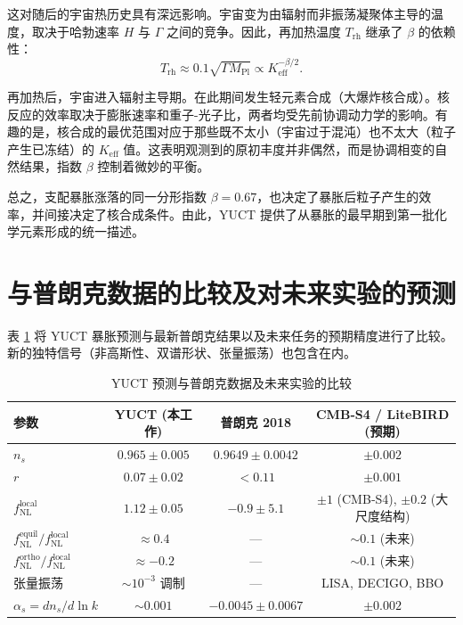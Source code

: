 \documentclass[11pt,a4paper]{article}
\newcommand{\Keff}{K_{\mathrm{eff}}}
\newcommand{\rs}{r}
\begin{document}
	这对随后的宇宙热历史具有深远影响。宇宙变为由辐射而非振荡凝聚体主导的温度，取决于哈勃速率 \(H\) 与 \(\Gamma\) 之间的竞争。因此，再加热温度 \(T_{\mathrm{rh}}\) 继承了 \(\beta\) 的依赖性：
	\begin{equation}
		T_{\mathrm{rh}} \approx 0.1 \sqrt{\Gamma M_{\mathrm{Pl}}} \propto \Keff^{-\beta/2}.
		\label{eq:trh}
	\end{equation}
	
	再加热后，宇宙进入辐射主导期。在此期间发生轻元素合成（大爆炸核合成）。核反应的效率取决于膨胀速率和重子-光子比，两者均受先前协调动力学的影响。有趣的是，核合成的最优范围对应于那些既不太小（宇宙过于混沌）也不太大（粒子产生已冻结）的 \(\Keff\) 值。这表明观测到的原初丰度并非偶然，而是协调相变的自然结果，指数 \(\beta\) 控制着微妙的平衡。
	
	总之，支配暴胀涨落的同一分形指数 \(\beta = 0.67\)，也决定了暴胀后粒子产生的效率，并间接决定了核合成条件。由此，YUCT 提供了从暴胀的最早期到第一批化学元素形成的统一描述。
	
	\section{与普朗克数据的比较及对未来实验的预测}
	\label{sec:comparison}
	
	表 \ref{tab:comparison} 将 YUCT 暴胀预测与最新普朗克结果以及未来任务的预期精度进行了比较。新的独特信号（非高斯性、双谱形状、张量振荡）也包含在内。
	
	\begin{table}[htbp]
		\centering
		\caption{YUCT 预测与普朗克数据及未来实验的比较}
		\label{tab:comparison}
		\begin{tabular}{lccc}
			\toprule
			\textbf{参数} & \textbf{YUCT (本工作)} & \textbf{普朗克 2018} & \textbf{CMB‑S4 / LiteBIRD (预期)} \\
			\midrule
			\(n_s\) & \(0.965 \pm 0.005\) & \(0.9649 \pm 0.0042\) & \(\pm 0.002\) \\
			\(\rs\) & \(0.07 \pm 0.02\) & \(<0.11\) & \(\pm 0.001\) \\
			\(f_{\mathrm{NL}}^{\mathrm{local}}\) & \(1.12 \pm 0.05\) & \(-0.9 \pm 5.1\) & \(\pm 1\) (CMB‑S4), \(\pm 0.2\) (大尺度结构) \\
			\(f_{\mathrm{NL}}^{\mathrm{equil}} / f_{\mathrm{NL}}^{\mathrm{local}}\) & \(\approx 0.4\) & — & \(\sim 0.1\) (未来) \\
			\(f_{\mathrm{NL}}^{\mathrm{ortho}} / f_{\mathrm{NL}}^{\mathrm{local}}\) & \(\approx -0.2\) & — & \(\sim 0.1\) (未来) \\
			张量振荡 & \( \sim 10^{-3}\) 调制 & — & LISA, DECIGO, BBO \\
			\(\alpha_s = dn_s/d\ln k\) & \(\sim 0.001\) & \(-0.0045 \pm 0.0067\) & \(\pm 0.002\) \\
			\bottomrule
		\end{tabular}
	\end{table}
	
\end{document}
